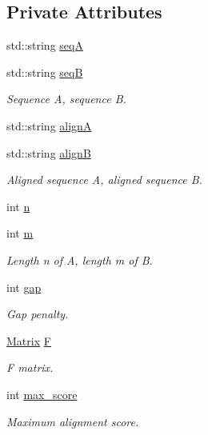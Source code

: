 \subsection*{Private Attributes}
\begin{DoxyCompactItemize}
\item 
std\+::string \hyperlink{class_needleman_wunsch_aeda77308a2f7866e36c4d1f518d53dcf}{seq\+A}
\item 
std\+::string \hyperlink{class_needleman_wunsch_a2da968f8712b2a7c69214be8bc09097b}{seq\+B}
\begin{DoxyCompactList}\small\item\em Sequence A, sequence B. \end{DoxyCompactList}\item 
std\+::string \hyperlink{class_needleman_wunsch_a0c94eb05cd5e7c47a9fdde9b5685ad9d}{align\+A}
\item 
std\+::string \hyperlink{class_needleman_wunsch_ada9b7b807c02785439f0a85221352971}{align\+B}
\begin{DoxyCompactList}\small\item\em Aligned sequence A, aligned sequence B. \end{DoxyCompactList}\item 
int \hyperlink{class_needleman_wunsch_aad1e6ea335606069514970380d29b66c}{n}
\item 
int \hyperlink{class_needleman_wunsch_a57c16e0704f58fa1cb4c5caf77dd3224}{m}
\begin{DoxyCompactList}\small\item\em Length n of A, length m of B. \end{DoxyCompactList}\item 
int \hyperlink{class_needleman_wunsch_ac66a16f7d4a66493f552a241109f1368}{gap}
\begin{DoxyCompactList}\small\item\em Gap penalty. \end{DoxyCompactList}\item 
\hyperlink{edit__distance_8hpp_a0eb1dc942afe714c426a46f6ca30b86d}{Matrix} \hyperlink{class_needleman_wunsch_a1084aa9b30f526dcf688fc4b39f8584d}{F}
\begin{DoxyCompactList}\small\item\em F matrix. \end{DoxyCompactList}\item 
int \hyperlink{class_needleman_wunsch_a4424562e115a1ecb43648aaf4d40e90d}{max\+\_\+score}
\begin{DoxyCompactList}\small\item\em Maximum alignment score. \end{DoxyCompactList}\end{DoxyCompactItemize}


